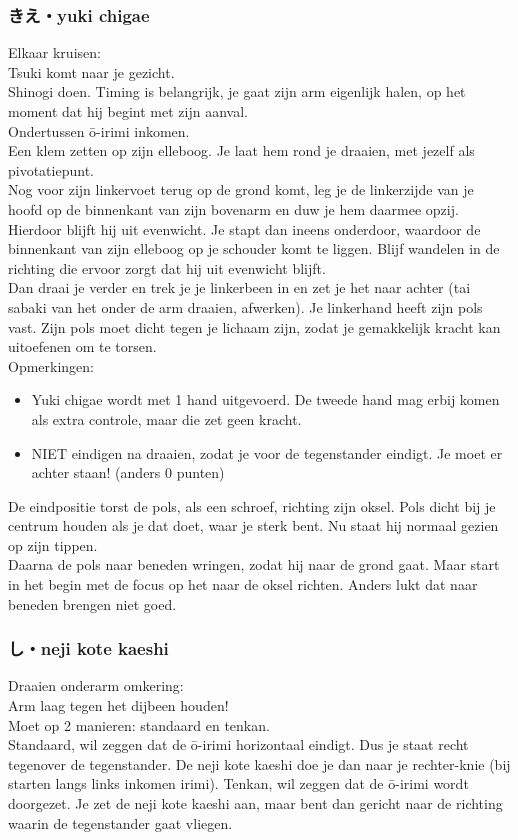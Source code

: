 \subsubsection{きえ・yuki chigae}
Elkaar kruisen:\\
Tsuki komt naar je gezicht.\\
Shinogi doen. Timing is belangrijk, je gaat zijn arm eigenlijk halen, op het moment dat hij begint met zijn aanval.\\
Ondertussen \={o}-irimi inkomen.\\
Een klem zetten op zijn elleboog. Je laat hem rond je draaien, met jezelf als pivotatiepunt.\\
Nog voor zijn linkervoet terug op de grond komt, leg je de linkerzijde van je hoofd op de binnenkant van zijn bovenarm en duw je hem daarmee opzij. Hierdoor blijft hij uit evenwicht. Je stapt dan ineens onderdoor, waardoor de binnenkant van zijn elleboog op je schouder komt te liggen. Blijf wandelen in de richting die ervoor zorgt dat hij uit evenwicht blijft.\\
Dan draai je verder en trek je je linkerbeen in en zet je het naar achter (tai sabaki van het onder de arm draaien, afwerken). Je linkerhand heeft zijn pols vast. Zijn pols moet dicht tegen je lichaam zijn, zodat je gemakkelijk kracht kan uitoefenen om te torsen.\\
Opmerkingen:\\
\begin{itemize}
\item Yuki chigae wordt met 1 hand uitgevoerd. De tweede hand mag erbij komen als extra controle, maar die zet geen kracht.
\item NIET eindigen na draaien, zodat je voor de tegenstander eindigt. Je moet er achter staan! (anders 0 punten)
\end{itemize}
De eindpositie torst de pols, als een schroef, richting zijn oksel. Pols dicht bij je centrum houden als je dat doet, waar je sterk bent. Nu staat hij normaal gezien op zijn tippen.\\
Daarna de pols naar beneden wringen, zodat hij naar de grond gaat. Maar start in het begin met de focus op het naar de oksel richten. Anders lukt dat naar beneden brengen niet goed.

\subsubsection{し・neji kote kaeshi}
Draaien onderarm omkering:\\
Arm laag tegen het dijbeen houden!\\
Moet op 2 manieren: standaard en tenkan.\\
Standaard, wil zeggen dat de \={o}-irimi horizontaal eindigt. Dus je staat recht tegenover de tegenstander. De neji kote kaeshi doe je dan naar je rechter-knie (bij starten langs links inkomen irimi).
Tenkan, wil zeggen dat de \={o}-irimi wordt doorgezet. Je zet de neji kote kaeshi aan, maar bent dan gericht naar de richting waarin de tegenstander gaat vliegen.

